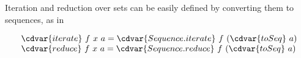 \begin{gram}
Iteration and reduction over sets can be easily defined by converting
them to sequences, as in

\[
\begin{array}{l}
\cdvar{iterate}~f~x~a = \cdvar{Sequence.iterate}~f~(\cdvar{toSeq}~a)\\
\cdvar{reduce}~f~x~a = \cdvar{Sequence.reduce}~f~(\cdvar{toSeq}~a)
\end{array}
\]
\end{gram}




